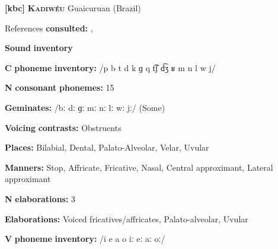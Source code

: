 \documentclass[output=paper]{langsci/langscibook}
\begin{document}
\begin{styleBody}
\textbf{[kbc]}   \textbf{\textsc{Kadiwéu}}  Guaicuruan (Brazil)
\end{styleBody}

\begin{styleBody}
References \textbf{consulted:} \citet{Braggio1981}, \citet{Sandalo1997}
\end{styleBody}

\begin{styleBody}
\textbf{Sound} \textbf{inventory}
\end{styleBody}

\begin{styleBody}
\textbf{C} \textbf{phoneme} \textbf{inventory:} /p b t d k ɡ q t͡ʃ d͡ʒ ʁ m n l w j/
\end{styleBody}

\begin{styleBody}
\textbf{N} \textbf{consonant} \textbf{phonemes:} 15
\end{styleBody}

\begin{styleBody}
\textbf{Geminates:} /bː dː ɡː mː nː lː wː jː/ (Some)
\end{styleBody}

\begin{styleBody}
\textbf{Voicing} \textbf{contrasts:} Obstruents
\end{styleBody}

\begin{styleBody}
\textbf{Places:} Bilabial, Dental, Palato-Alveolar, Velar, Uvular
\end{styleBody}

\begin{styleBody}
\textbf{Manners:} Stop, Affricate, Fricative, Nasal, Central approximant, Lateral approximant
\end{styleBody}

\begin{styleBody}
\textbf{N} \textbf{elaborations:} 3
\end{styleBody}

\begin{styleBody}
\textbf{Elaborations:} Voiced fricatives/affricates, Palato-alveolar, Uvular
\end{styleBody}

\begin{styleBody}
\textbf{V} \textbf{phoneme} \textbf{inventory:} /i e a o iː eː aː oː/
\end{styleBody}
\end{document}
